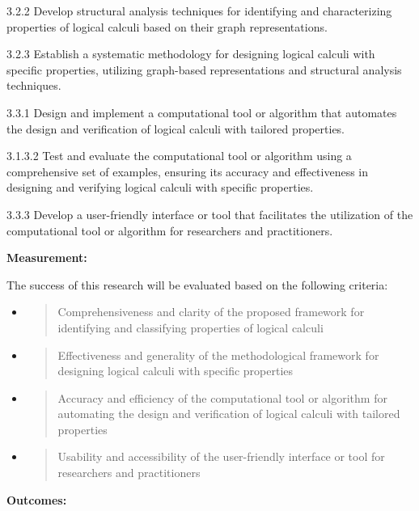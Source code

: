 3.2.2 Develop structural analysis techniques for identifying and
characterizing properties of logical calculi based on their graph
representations.

3.2.3 Establish a systematic methodology for designing logical calculi
with specific properties, utilizing graph-based representations and
structural analysis techniques.

3.3.1 Design and implement a computational tool or algorithm that
automates the design and verification of logical calculi with tailored
properties.

3.1.3.2 Test and evaluate the computational tool or algorithm using a
comprehensive set of examples, ensuring its accuracy and effectiveness
in designing and verifying logical calculi with specific properties.

3.3.3 Develop a user-friendly interface or tool that facilitates the
utilization of the computational tool or algorithm for researchers and
practitioners.

\textbf{Measurement:}

The success of this research will be evaluated based on the following
criteria:

\begin{itemize}
\item
  \begin{quote}
  Comprehensiveness and clarity of the proposed framework for
  identifying and classifying properties of logical calculi
  \end{quote}
\item
  \begin{quote}
  Effectiveness and generality of the methodological framework for
  designing logical calculi with specific properties
  \end{quote}
\item
  \begin{quote}
  Accuracy and efficiency of the computational tool or algorithm for
  automating the design and verification of logical calculi with
  tailored properties
  \end{quote}
\item
  \begin{quote}
  Usability and accessibility of the user-friendly interface or tool for
  researchers and practitioners
  \end{quote}
\end{itemize}

\textbf{Outcomes:}

